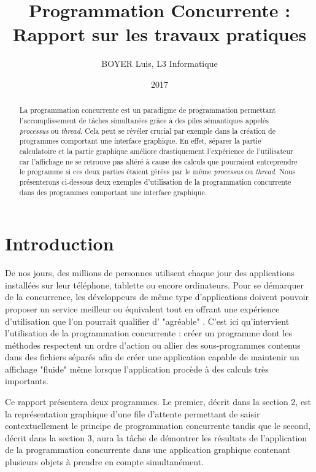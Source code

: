 \documentclass{article}
\title{Programmation Concurrente : \\Rapport sur les travaux pratiques}
\author{BOYER Luis, L3 Informatique}
\date{2017}
\begin{document}
\maketitle

\begin{abstract}
La programmation concurrente est un paradigme de programmation permettant l'accomplissement de t\^{a}ches simultan\'{e}es gr\^{a}ce \`{a} des piles s\'{e}mantiques appel\'{e}s \textit{processus} ou \textit{thread}. Cela peut se r\'{e}v\'{e}ler crucial par exemple dans la cr\'{e}ation de programmes comportant une interface graphique. En effet, s\'{e}parer la partie calculatoire et la partie graphique am\'{e}liore drastiquement l'exp\'{e}rience de l'utilisateur car l'affichage ne se retrouve pas alt\'{e}r\'{e} \`{a} cause des calculs que pourraient entreprendre le programme si ces deux parties \'{e}taient g\'{e}r\'{e}es par le m\^{e}me \textit{processus} ou \textit{thread}. Nous pr\'{e}senterons ci-dessous deux exemples d'utilisation de la programmation concurrente dans des programmes comportant une interface graphique.
\end{abstract}

\bigskip
\bigskip
\bigskip

\section{Introduction}
\label{section:intro}

De nos jours, des millions de personnes utilisent chaque jour des applications install\'{e}es sur leur t\'{e}l\'{e}phone, tablette ou encore ordinateurs. Pour se d\'{e}marquer de la concurrence, les d\'{e}veloppeurs de m\^{e}me type d'applications doivent pouvoir proposer un service meilleur ou \'{e}quivalent tout en offrant une exp\'{e}rience d'utilisation que l'on pourrait qualifier d' "agr\'{e}able" . C'est ici qu'intervient l'utilisation de la programmation concurrente : cr\'{e}er un programme dont les m\'{e}thodes respectent un ordre d'action ou allier des sous-programmes contenus dans des fichiers s\'{e}par\'{e}s afin de cr\'{e}er une application capable de maintenir un affichage "fluide" m\^{e}me lorsque l'application proc\`{e}de \`{a} des calculs tr\`{e}s importants.

Ce rapport pr\'{e}sentera deux programmes. Le premier, d\'{e}crit dans la section 2, est la repr\'{e}sentation graphique d'une file d'attente permettant de saisir contextuellement le principe de programmation concurrente tandis que le second, d\'{e}crit dans la section 3, aura la t\^{a}che de d\'{e}montrer les r\'{e}sultats de l'application de la programmation concurrente dans une application graphique contenant plusieurs objets \`{a} prendre en compte simultan\'{e}ment.
\end{document}
